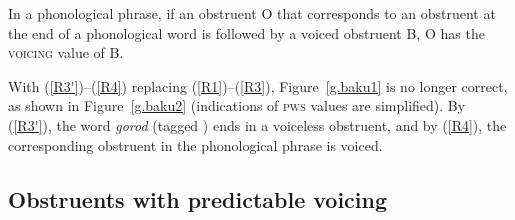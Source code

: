 \documentclass[output=paper]{langsci/langscibook}
\begin{document}
\begin{exe}
\ex
\label{R4} In a phonological phrase, if an obstruent O that
  corresponds to an obstruent at the end of a phonological word is followed
  by a voiced obstruent B, O has the \textsc{voicing} value of B.
\end{exe}

With (\ref{R3'})--(\ref{R4}) replacing (\ref{R1})--(\ref{R3}),
Figure~\ref{g.baku1} is no longer correct, as shown in Figure~\ref{g.baku2}
(indications of \textsc{pws} values are simplified).  By (\ref{R3'}), the word
\emph{gorod} (tagged ) ends in a voiceless obstruent, and by (\ref{R4}),
the corresponding obstruent in the phonological phrase is voiced.  %



\subsection{Obstruents with predictable voicing}
\label{sec:1.7.3}
\end{document}
